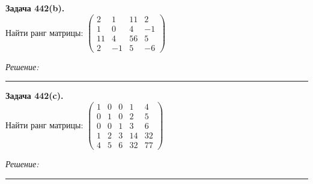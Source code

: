 \documentclass[a4paper, 12pt]{article}
\newenvironment{problem}[2][Задача]
    { \begin{mdframed}[backgroundcolor=gray!10] \textbf{#1 #2.} \\}
    {  \end{mdframed}}
\newenvironment{solution}
    {\textit{Решение: }}
    {\noindent\rule{7in}{1.5pt}}
\begin{document}
\begin{problem}{442(b)}
Найти ранг матрицы:
$\left(\begin{array}{rrrr}2 & 1 & 11 & 2\\1 & 0 & 4 & -1\\ 11 & 4 & 56 & 5 \\ 2 & -1 & 5 & -6\end{array}\right)$


\end{problem}
\begin{solution}



\end{solution} 

\begin{problem}{442(c)}
Найти ранг матрицы:
$\left(\begin{array}{rrrrr}1 & 0 & 0 & 1 & 4\\0 & 1 & 0 & 2 & 5\\ 0 & 0 & 1 & 3 & 6 \\ 1 & 2 & 3 & 14 & 32\\ 4 & 5 & 6 & 32 & 77\end{array}\right)$

\end{problem}
\begin{solution}



\end{solution} 

\end{document}
